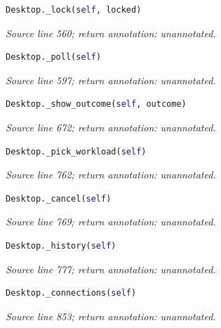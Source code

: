 

\begin{lstlisting}[language=Python]
Desktop._lock(self, locked)
\end{lstlisting}


{\small \textit{Source line 560; return annotation: unannotated.}}



\begin{lstlisting}[language=Python]
Desktop._poll(self)
\end{lstlisting}


{\small \textit{Source line 597; return annotation: unannotated.}}



\begin{lstlisting}[language=Python]
Desktop._show_outcome(self, outcome)
\end{lstlisting}


{\small \textit{Source line 672; return annotation: unannotated.}}



\begin{lstlisting}[language=Python]
Desktop._pick_workload(self)
\end{lstlisting}


{\small \textit{Source line 762; return annotation: unannotated.}}



\begin{lstlisting}[language=Python]
Desktop._cancel(self)
\end{lstlisting}


{\small \textit{Source line 769; return annotation: unannotated.}}



\begin{lstlisting}[language=Python]
Desktop._history(self)
\end{lstlisting}


{\small \textit{Source line 777; return annotation: unannotated.}}



\begin{lstlisting}[language=Python]
Desktop._connections(self)
\end{lstlisting}


{\small \textit{Source line 853; return annotation: unannotated.}}

